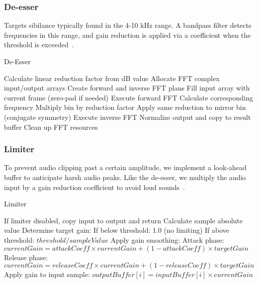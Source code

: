 \documentclass[conference]{IEEEtran}
\begin{document}
\subsubsection{De-esser}
Targets sibilance typically found in the 4-10 kHz range. A bandpass filter detects frequencies in this range, and gain reduction is applied via a coefficient when the threshold is exceeded~\cite{linhard2017}.

\begin{algorithm}
\caption{De-Esser}
\begin{algorithmic}[1]
\State Calculate linear reduction factor from dB value
\State Allocate FFT complex input/output arrays
\State Create forward and inverse FFT plans
    \State Fill input array with current frame (zero-pad if needed)
    \State Execute forward FFT
        \State Calculate corresponding frequency
            \State Multiply bin by reduction factor
            \State Apply same reduction to mirror bin (conjugate symmetry)
        \EndIf
    \EndFor
    \State Execute inverse FFT
    \State Normalize output and copy to result buffer
\EndFor
\State Clean up FFT resources
\EndProcedure
\end{algorithmic}
\end{algorithm}

\subsubsection{Limiter}
To prevent audio clipping past a certain amplitude, we implement a look-ahead buffer to anticipate harsh audio peaks. Like the de-esser, we multiply the audio input by a gain reduction coefficient to avoid loud sounds~\cite{giannoulis2012}.

\begin{algorithm}
\caption{Limiter}
\begin{algorithmic}[1]
\State If limiter disabled, copy input to output and return
    \State Calculate sample absolute value
    \State Determine target gain:
    \State \hspace{\algorithmicindent} If below threshold: 1.0 (no limiting)
    \State \hspace{\algorithmicindent} If above threshold: $threshold/sampleValue$
    \State Apply gain smoothing:
        \State Attack phase: $currentGain = attackCoeff \times currentGain + (1-attackCoeff) \times targetGain$
    \Else
        \State Release phase: $currentGain = releaseCoeff \times currentGain + (1-releaseCoeff) \times targetGain$
    \EndIf
    \State Apply gain to input sample: $outputBuffer[i] = inputBuffer[i] \times currentGain$
\EndFor
\EndProcedure
\end{algorithmic}
\end{algorithm}
\end{document}
